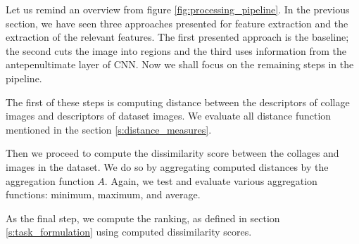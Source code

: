 Let us remind an overview from figure \ref{fig:processing_pipeline}. In the previous section, we have seen three approaches presented for feature extraction and the extraction of the relevant features. The first presented approach is the baseline; the second cuts the image into regions and the third uses information from the antepenultimate layer of CNN. Now we shall focus on the remaining steps in the pipeline.

The first of these steps is computing distance between the descriptors of collage images and descriptors of dataset images. We  evaluate all distance function mentioned in the section \ref{s:distance_measures}.

Then we proceed to compute the dissimilarity score between the collages and images in the dataset. We do so by aggregating computed distances by the aggregation function $A$. Again, we test and evaluate various aggregation functions: minimum, maximum, and average.

As the final step, we compute the ranking, as defined in section \ref{s:task_formulation} using computed dissimilarity scores.





